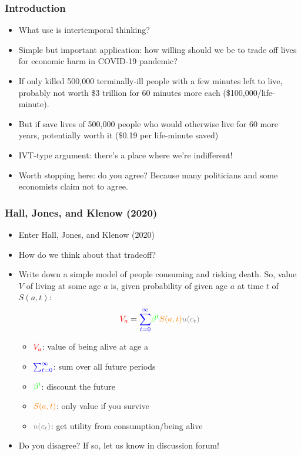 \documentclass{beamer}
\author{Trevor S. Gallen}
\date{}
\begin{document}
\begin{frame}
\titlepage
\end{frame}

\begin{frame}
\frametitle[alignment=center]{Introduction}
\begin{itemize}
\item What use is intertemporal thinking?
\bigskip
\item Simple but important application: how willing should we be to trade off lives for economic harm in COVID-19 pandemic?
\bigskip
\item If only killed 500,000 terminally-ill people with a few minutes left to live, probably not worth \$3 trillion for 60 minutes more each (\$100,000/life-minute).  
\bigskip
\item But if save lives of 500,000 people who would otherwise live for 60 more years, potentially worth it (\$0.19 per life-minute saved)
\bigskip
\item IVT-type argument:  there's a place where we're indifferent!
\bigskip
\item Worth stopping here: do you agree?  Because many politicians and some economists claim not to agree.
\end{itemize}
\end{frame}

\begin{frame}
\frametitle[alignment=center]{Hall, Jones, and Klenow (2020)}
\begin{itemize}
\item Enter Hall, Jones, and Klenow (2020)
\bigskip
\item How do we think about that tradeoff?
\bigskip 
\item Write down a simple model of people consuming and risking death.  So, value $V$ of living at some age $a$ is, given probability of given age $a$ at time $t$ of $S(a,t)$:
$$\textcolor{red}{V_a}=\textcolor{blue}{\sum_{t=0}^\infty}\textcolor{green}{\beta^t}\textcolor{orange}{S(a,t)}\textcolor{gray}{u(c_t)}$$
\begin{itemize}
\item $\textcolor{red}{V_a}$: value of being alive at age a
\item $\textcolor{blue}{\sum_{t=0}^\infty}$: sum over all future periods
\item $\textcolor{green}{\beta^t}$: discount the future
\item $\textcolor{orange}{S(a,t)}$: only value if you survive
\item $\textcolor{gray}{u(c_t)}$: get utility from consumption/being alive
\end{itemize}
\item Do you disagree? If so, let us know in discussion forum!
\end{itemize}
\end{frame}
\end{document}
